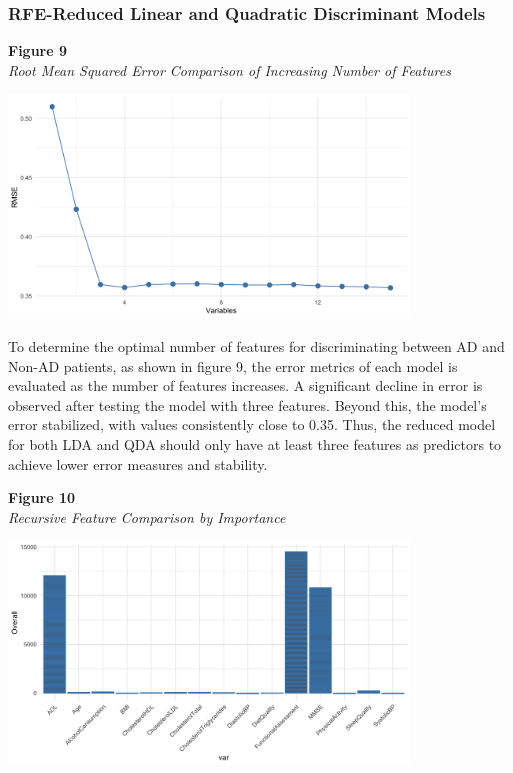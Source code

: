 \documentclass[12pt]{article}
\begin{document}
\subsubsection{RFE-Reduced Linear and Quadratic Discriminant Models}
\textbf{Figure 9}\\
\textit{Root Mean Squared Error Comparison of Increasing Number of Features}
\begin{center}
    \includegraphics[width = 0.8\textwidth]{Required Number of Features.png}
\end{center}

To determine the optimal number of features for discriminating between AD and Non-AD patients, as shown in figure 9, the error metrics of each model is evaluated as the number of features increases. A significant decline in error is observed after testing the model with three features. Beyond this, the model's error
stabilized, with values consistently close to 0.35. Thus, the reduced model for both LDA and QDA should only have at least three features as predictors to achieve lower error measures and stability. 

\noindent
\textbf{Figure 10} \\
\textit{Recursive Feature Comparison by Importance}
\begin{center}
    \includegraphics[width = 0.8\textwidth]{RFE Feature Selection.png}
\end{center}
\end{document}
